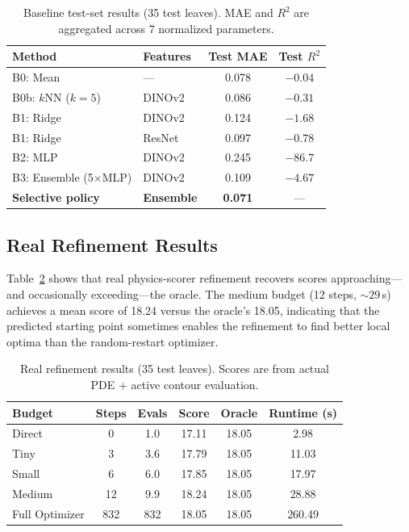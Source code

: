 \documentclass[11pt,a4paper]{article}
\begin{document}
\begin{table}[h]
\centering
\caption{Baseline test-set results (35 test leaves).
MAE and $R^2$ are aggregated across 7 normalized parameters.}
\label{tab:baselines}
\begin{tabular}{llcc}
\toprule
Method & Features & Test MAE & Test $R^2$ \\
\midrule
B0: Mean            & ---      & 0.078 & $-0.04$ \\
B0b: $k$NN ($k{=}5$)  & DINOv2   & 0.086 & $-0.31$ \\
B1: Ridge           & DINOv2   & 0.124 & $-1.68$ \\
B1: Ridge           & ResNet   & 0.097 & $-0.78$ \\
B2: MLP             & DINOv2   & 0.245 & $-86.7$ \\
B3: Ensemble (5$\times$MLP) & DINOv2 & 0.109 & $-4.67$ \\
\midrule
\textbf{Selective policy} & \textbf{Ensemble} & \textbf{0.071} & --- \\
\bottomrule
\end{tabular}
\end{table}

\subsection{Real Refinement Results}

Table~\ref{tab:refinement} shows that real physics-scorer refinement
recovers scores approaching---and occasionally exceeding---the oracle.
The medium budget (12 steps, ${\sim}29$\,s) achieves a mean score of 18.24
versus the oracle's 18.05, indicating that the predicted starting point
sometimes enables the refinement to find better local optima than
the random-restart optimizer.

\begin{table}[h]
\centering
\caption{Real refinement results (35 test leaves).
Scores are from actual PDE + active contour evaluation.}
\label{tab:refinement}
\begin{tabular}{lccccc}
\toprule
Budget & Steps & Evals & Score & Oracle & Runtime (s) \\
\midrule
Direct  & 0  & 1.0 & 17.11 & 18.05 & 2.98 \\
Tiny    & 3  & 3.6 & 17.79 & 18.05 & 11.03 \\
Small   & 6  & 6.0 & 17.85 & 18.05 & 17.97 \\
Medium  & 12 & 9.9 & 18.24 & 18.05 & 28.88 \\
\midrule
Full Optimizer & 832 & 832 & 18.05 & 18.05 & 260.49 \\
\bottomrule
\end{tabular}
\end{table}
\end{document}

